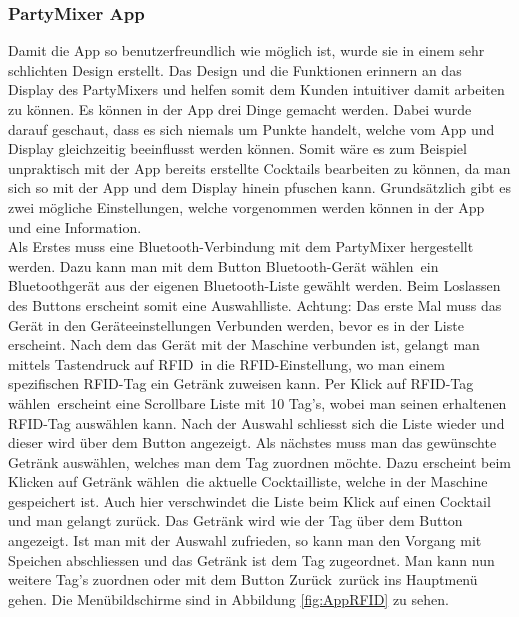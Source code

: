 \subsubsection{PartyMixer App}
\label{subsubsec:Software_PartyMixer_App}

Damit die App so benutzerfreundlich wie möglich ist, wurde sie in einem sehr schlichten Design erstellt. Das Design und die Funktionen erinnern an das Display des PartyMixers und helfen somit dem Kunden intuitiver damit arbeiten zu können. Es können in der App drei Dinge gemacht werden. Dabei wurde darauf geschaut, dass es sich niemals um Punkte handelt, welche vom App und Display gleichzeitig beeinflusst werden können. Somit wäre es zum Beispiel unpraktisch mit der App bereits erstellte Cocktails bearbeiten zu können, da man sich so mit der App und dem Display hinein pfuschen kann. Grundsätzlich gibt es zwei mögliche Einstellungen, welche vorgenommen werden können in der App und eine Information. \\ 

Als Erstes muss eine Bluetooth-Verbindung mit dem PartyMixer hergestellt werden. Dazu kann man mit dem Button \flqq Bluetooth-Gerät wählen\frqq~ein Bluetoothgerät aus der eigenen Bluetooth-Liste gewählt werden. Beim Loslassen des Buttons erscheint somit eine Auswahlliste. Achtung: Das erste Mal muss das Gerät in den Geräteeinstellungen Verbunden werden, bevor es in der Liste erscheint. Nach dem das Gerät mit der Maschine verbunden ist, gelangt man mittels Tastendruck auf \flqq RFID\frqq~in die RFID-Einstellung, wo man einem spezifischen RFID-Tag ein Getränk zuweisen kann. Per Klick auf \flqq RFID-Tag wählen\frqq~erscheint eine Scrollbare Liste mit 10 Tag's, wobei man seinen erhaltenen RFID-Tag auswählen kann. Nach der Auswahl schliesst sich die Liste wieder und dieser wird über dem Button angezeigt. Als nächstes muss man das gewünschte Getränk auswählen, welches man dem Tag zuordnen möchte. Dazu erscheint beim Klicken auf \flqq Getränk wählen\frqq~die aktuelle Cocktailliste, welche in der Maschine gespeichert ist. Auch hier verschwindet die Liste beim Klick auf einen Cocktail und man gelangt zurück. Das Getränk wird wie der Tag über dem Button angezeigt. Ist man mit der Auswahl zufrieden, so kann man den Vorgang mit Speichen abschliessen und das Getränk ist dem Tag zugeordnet. Man kann nun weitere Tag's zuordnen oder mit dem Button \flqq Zurück\frqq~zurück ins Hauptmenü gehen.
Die Menübildschirme sind in Abbildung \ref{fig:AppRFID} zu sehen.\\

